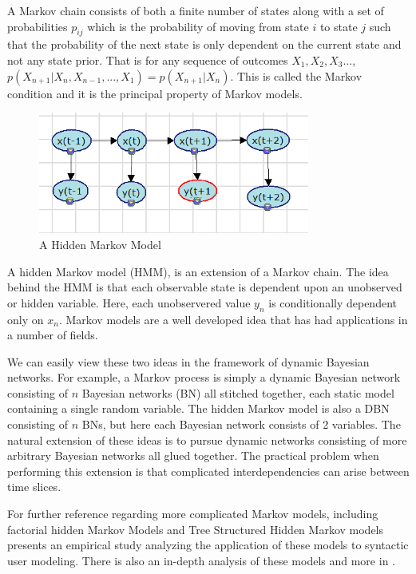\documentclass{article}
\begin{document}
A Markov chain consists of both a finite number of states along with a set of probabilities $p_{ij}$ which is the probability of moving from state $i$ to state $j$ such that the probability of the next state is only dependent on the current state and not any state prior. That is for any sequence of outcomes $X_{1}, X_{2}, X_{3} ...$, $p(X_{n+1} | X_{n}, X_{n-1}, ..., X_{1}) = p(X_{n+1} | X_{n})$. This is called the Markov condition and it is the principal property of Markov models. 

\begin{figure}[h]
\begin{center}
\includegraphics[height=40mm]{figures/hiddenmarkovmodel.png}
\caption{A Hidden Markov Model}
\label{fig:hiddenmarkovmodel}
\end{center}
\end{figure}

A hidden Markov model (HMM), is an extension of a Markov chain. The idea behind the HMM is that each observable state is dependent upon an unobserved or hidden variable. Here, each unobservered value $y_{n}$ is conditionally dependent only on $x_{n}$. Markov models are a well developed idea that has had applications in a number of fields. 

We can easily view these two ideas in the framework of dynamic Bayesian networks. For example, a Markov process is simply a dynamic Bayesian network consisting of $n$ Bayesian networks (BN) all stitched together, each static model containing a single random variable. The hidden Markov model is also a DBN consisting of $n$ BNs, but here each Bayesian network consists of 2 variables. The natural extension of these ideas is to pursue dynamic networks consisting of more arbitrary Bayesian networks all glued together. The practical problem when performing this extension is that complicated interdependencies can arise between time slices. 

For further reference regarding more complicated Markov models, including factorial hidden Markov Models and Tree Structured Hidden Markov models \cite {kuenzer-empirical} presents an empirical study analyzing the application of these models to syntactic user modeling. There is also an in-depth analysis of these models and more in \cite{murphy}. 
\end{document}
